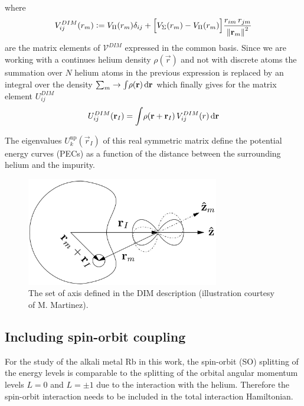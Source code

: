 			where
			\begin{align}
				V^{DIM}_{ij}(r_m) \vcentcolon= V_\Pi(r_m)\delta_{ij}+\qty\Big[V_\Sigma(r_m)-V_\Pi(r_m)]\frac{r_{im}\,r_{jm}}{\norm{\bm{\mathrm{r}}_m}^2} \label{eq:vdim}
			\end{align}
			are the matrix elements of $\mathcal{V}^{DIM}$ expressed in the common basis. Since we are working with a continues helium density $\rho(\vec{r})$ and not with discrete atoms the summation over $N$ helium atoms in the previous expression is replaced by an integral over the density $\sum_m\rightarrow\int\!\rho(\bm{\mathrm{r}})\,\mathrm{d}{\bm{\mathrm{r}}}$ which finally gives for the matrix element $U^{DIM}_{ij}$
			\begin{align}
				U^{DIM}_{ij}(\bm{\mathrm{r}}_I) = \int\! \rho\qty(\bm{\mathrm{r}}+\bm{\mathrm{r}}_I)\,V^{DIM}_{ij}(r)\,\mathrm{d}{\bm{\mathrm{r}}} \label{eq:u-dim}
			\end{align}
			
			The eigenvalues $U^{\mathrm{np}}_k(\vec{r}_I)$ of this real symmetric matrix define the potential energy curves (PECs) as a function of the distance between the surrounding helium and the impurity.
			\begin{figure}[t]
				\begin{center}
					\includegraphics[width=0.75\textwidth]{dim-axes}
				\end{center}
				\caption{The set of axis defined in the DIM description (illustration courtesy of M. Martinez).}
				\label{fig:dim-axes}
			\end{figure}			
		
		\subsection{Including spin-orbit coupling}
			For the study of the alkali metal Rb in this work, the spin-orbit (SO) splitting of the energy levels is comparable to the splitting of the orbital angular momentum levels $L=0$ and $L=\pm 1$ due to the interaction with the helium. Therefore the spin-orbit interaction needs to be included in the total interaction Hamiltonian.\\
			

